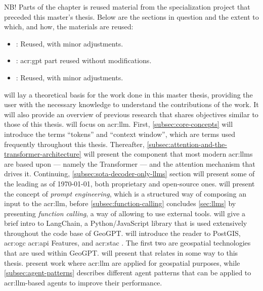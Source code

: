 \begin{itshape}
    NB! Parts of the  chapter is reused material from the specialization project \citep{holmLLMsDeathGIS2023} that preceded this master's thesis. Below are the sections in question and the extent to which, and how, the materials are reused:

    \begin{itemize}
        \item {}: Reused, with minor adjustments.
        \item {}: \acrshort{acr:gpt} part reused without modifications.
        \item {}: Reused, with minor adjustments.
    \end{itemize}
\end{itshape}

\vspace{12pt}

\noindent {} will lay a theoretical basis for the work done in this master thesis, providing the user with the necessary knowledge to understand the contributions of the work. It will also provide an overview of previous research that shares objectives similar to those of this thesis.  will focus on \gls{acr:llm}. First, \autoref{subsec:core-concepts} will introduce the terms \enquote{tokens} and \enquote{context window}, which are terms used frequently throughout this thesis. Thereafter, \autoref{subsec:attention-and-the-transformer-architecture} will present the component that most modern \glspl{acr:llm} are based upon --- namely the Transformer --- and the attention mechanism that drives it. Continuing, \autoref{subsec:sota-decoder-only-llms} section will present some of the leading  as of \today, both proprietary and open-source ones.  will present the concept of \textit{prompt engineering}, which is a structured way of composing an input to the \acrshort{acr:llm}, before \autoref{subsec:function-calling} concludes \autoref{sec:llms} by presenting \textit{function calling}, a way of allowing  to use external tools.  will give a brief intro to LangChain, a Python/JavaScript library that is used extensively throughout the code base of GeoGPT.  will introduce the reader to PostGIS, \acrshort{acr:ogc} \acrshort{acr:api} Features, and \acrshort{acr:stac} . The first two are geospatial technologies that are used within GeoGPT.  will present that relates in some way to this thesis.  present work where \acrshort{acr:llm} are applied for geospatial purposes, while \autoref{subsec:agent-patterns} describes different agent patterns that can be applied to \acrshort{acr:llm}-based agents to improve their performance.



